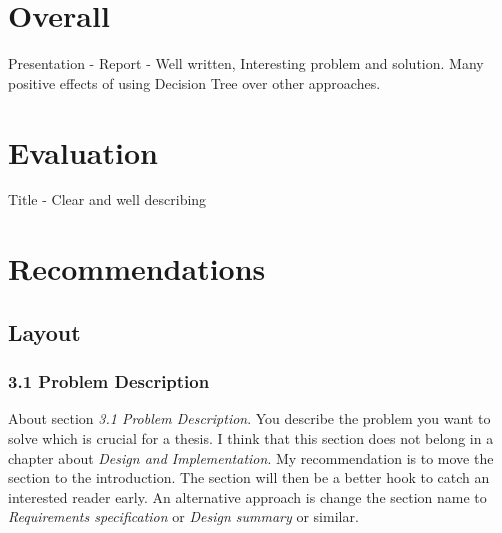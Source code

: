 \documentclass[
10pt, %
a4paper, %
oneside, %
headinclude,footinclude, %
BCOR5mm, %
]{scrartcl}
\title{\normalfont\spacedallcaps{Destination Prediction with Decision Tree}}
\author{\spacedlowsmallcaps{An opposition by Martin Agfjord*}}
\date{} %
\begin{document}
\renewcommand{\sectionmark}[1]{\markright{\spacedlowsmallcaps{#1}}}
\lehead{\mbox{\llap{\small\thepage\kern1em\color{halfgray} \vline}\color{halfgray}\hspace{0.5em}\rightmark\hfil}} %

\pagestyle{scrheadings} %

\maketitle %

{\let\thefootnote\relax{}

\section*{Overall}
Presentation -
\newline
Report - Well written, Interesting problem and solution. Many positive effects of using Decision Tree over other approaches.

\section*{Evaluation}
Title - Clear and well describing

\section*{Recommendations}
\subsection*{Layout}
\subsubsection*{3.1 Problem Description}
About section \emph{3.1 Problem Description}. You describe the problem you want to solve which is crucial for a thesis. I think that this section does not belong in a chapter about \emph{Design and Implementation}. My recommendation is to move the section to the introduction. The section will then be a better hook to catch an interested reader early.
\newline
An alternative approach is change the section name to \emph{Requirements specification} or \emph{Design summary} or similar.
}
\end{document}
